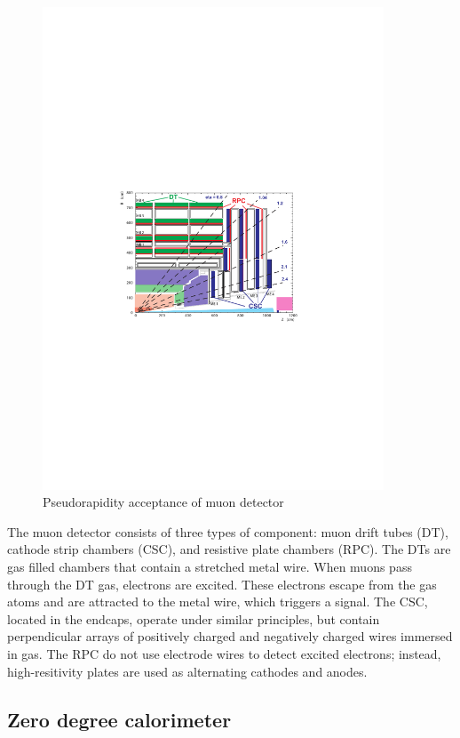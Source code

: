 \begin{figure}[h!]
\begin{centering}
\includegraphics[width=4in]{Chapter3/importfigs/Figure_001-006.pdf}
\par\end{centering}
\caption{Pseudorapidity acceptance of muon detector \label{fig:muonYZ}}
\end{figure}

The muon detector consists of three types of component: muon drift tubes (DT), cathode strip chambers (CSC), and resistive plate chambers (RPC). The DTs are gas filled chambers that contain a stretched metal wire. When muons pass through the DT gas, electrons are excited. These electrons escape from the gas atoms and are attracted to the metal wire, which triggers a signal. The CSC, located in the endcaps, operate under similar principles, but contain perpendicular arrays of positively charged and negatively charged wires immersed in gas. The RPC do not use electrode wires to detect excited electrons; instead, high-resitivity plates are used as alternating cathodes and anodes. 

\subsection{Zero degree calorimeter}

